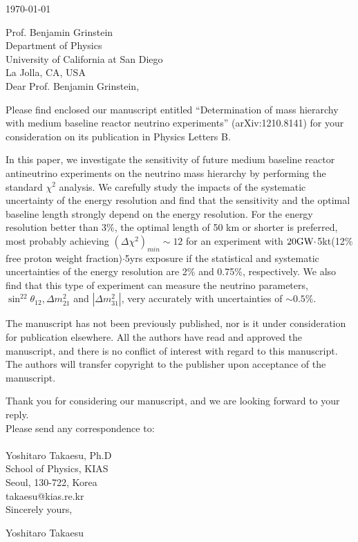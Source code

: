 \documentclass[12pt]{letter}
\begin{document}
\today

Prof. Benjamin Grinstein\\
Department of Physics\\
University of California at San Diego\\
La Jolla, CA, USA \\

Dear Prof. Benjamin Grinstein,

Please find enclosed our manuscript entitled ``Determination of mass
hierarchy with medium baseline reactor neutrino experiments'' (arXiv:1210.8141) for your consideration on
its publication in Physics Letters B.

In this paper, we investigate the sensitivity of future medium baseline
reactor antineutrino experiments on the neutrino mass hierarchy by
performing the standard $\chi^2$ analysis. We carefully study the impacts
of the systematic uncertainty of the energy resolution and find that the sensitivity
and the optimal baseline length strongly depend on the energy
resolution. For the energy resolution better than 3\%, the optimal length of 50 km or shorter is preferred,
most probably achieving $(\Delta\chi^2)_{min}\sim 12$ for an experiment with
$20{\rm GW}\cdot$5kt(12\% free proton weight fraction)$\cdot$5yrs
exposure if the statistical and systematic uncertainties of the energy
resolution are 2\% and
0.75\%, respectively. We also find that this type of experiment can measure the
neutrino parameters, $\sin^22\theta_{12}, \Delta m^2_{21}$ and $|\Delta
m^2_{31}|$, very accurately with uncertainties of $\sim 0.5\%$. 


The manuscript has not been previously published, nor is it under
consideration for publication elsewhere. All the authors have read and approved the manuscript, and there is no
conflict of interest with regard to this manuscript. The authors will
transfer copyright to the publisher upon acceptance of the manuscript.

Thank you for considering our manuscript, and we are looking forward to your reply.\\

Please send any correspondence to:\\\\
\hspace{2em}Yoshitaro Takaesu, Ph.D\\
\hspace{2em}School of Physics, KIAS\\
\hspace{2em}Seoul, 130-722, Korea\\
\hspace{2em}takaesu@kias.re.kr\\

Sincerely yours, 

Yoshitaro Takaesu
\end{document}

